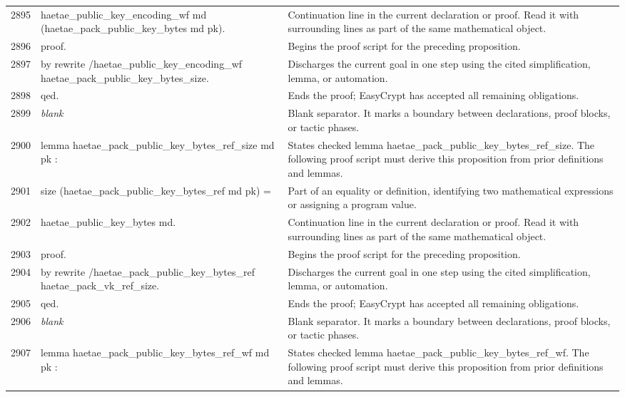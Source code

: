 \documentclass[10pt]{article}
\begin{document}
\begin{longtable}{r L{0.53\textwidth} L{0.37\textwidth}}
2895 & {\ttfamily\scriptsize   haetae\_public\_key\_encoding\_wf md (haetae\_pack\_public\_key\_bytes md pk).} & Continuation line in the current declaration or proof.  Read it with surrounding lines as part of the same mathematical object. \\
2896 & {\ttfamily\scriptsize proof.} & Begins the proof script for the preceding proposition. \\
2897 & {\ttfamily\scriptsize by rewrite /haetae\_public\_key\_encoding\_wf haetae\_pack\_public\_key\_bytes\_size.} & Discharges the current goal in one step using the cited simplification, lemma, or automation. \\
2898 & {\ttfamily\scriptsize qed.} & Ends the proof; EasyCrypt has accepted all remaining obligations. \\
2899 & {\ttfamily\scriptsize \emph{blank}} & Blank separator.  It marks a boundary between declarations, proof blocks, or tactic phases. \\
2900 & {\ttfamily\scriptsize lemma haetae\_pack\_public\_key\_bytes\_ref\_size md pk :} & States checked lemma haetae\_pack\_public\_key\_bytes\_ref\_size.  The following proof script must derive this proposition from prior definitions and lemmas. \\
2901 & {\ttfamily\scriptsize   size (haetae\_pack\_public\_key\_bytes\_ref md pk) =} & Part of an equality or definition, identifying two mathematical expressions or assigning a program value. \\
2902 & {\ttfamily\scriptsize   haetae\_public\_key\_bytes md.} & Continuation line in the current declaration or proof.  Read it with surrounding lines as part of the same mathematical object. \\
2903 & {\ttfamily\scriptsize proof.} & Begins the proof script for the preceding proposition. \\
2904 & {\ttfamily\scriptsize by rewrite /haetae\_pack\_public\_key\_bytes\_ref haetae\_pack\_vk\_ref\_size.} & Discharges the current goal in one step using the cited simplification, lemma, or automation. \\
2905 & {\ttfamily\scriptsize qed.} & Ends the proof; EasyCrypt has accepted all remaining obligations. \\
2906 & {\ttfamily\scriptsize \emph{blank}} & Blank separator.  It marks a boundary between declarations, proof blocks, or tactic phases. \\
2907 & {\ttfamily\scriptsize lemma haetae\_pack\_public\_key\_bytes\_ref\_wf md pk :} & States checked lemma haetae\_pack\_public\_key\_bytes\_ref\_wf.  The following proof script must derive this proposition from prior definitions and lemmas. \\

\end{longtable}
\end{document}
